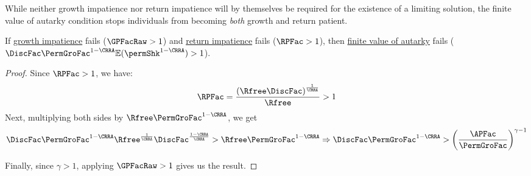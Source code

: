 \documentclass[BufferStockTheory]{subfiles}
\begin{document}
\begin{comment}
below stuff goes in growth section.
Strong growth impatience guarantees that the \textit{expectation} of normalized market resources becomes less than one market resources limit to infinity, since the condition will imply $\min \{\mathbb{E}\frac{\APFac}{\PermGroFacRnd}, \mathbb{E}\frac{R}{\PermGroFacRnd}\}< \GPFacNrm<1$. 


The growth impatience condition relates the \textit{expected} growth factor of permanent income to the \hyperlink{APFAC}{absolute patience factor}. Following the discussion below Assumption \ref{ass:RIC}, the growth factor of the ratio of expected market resources to expected permanent income as $m$ limits to infinity becomes $\min \{\frac{\APFac}{\PermGroFac}, \frac{R}{\PermGroFac}\}$, and we have $\min \{\frac{\APFac}{\PermGroFac}, \frac{R}{\PermGroFac}\}< \GPFacRaw$. Thus, growth impatience ensures the ratio of \textit{expected} market resources to \textit{expected} permanent income eventually falls as $\mNrm$ grows.
\end{comment}

While neither growth impatience nor return impatience will by themselves be required for the existence of a limiting solution, the finite value of autarky condition stops individuals from becoming \textit{both} growth and return patient. 

\begin{claim}\label{claim:noRICGIC}
If \hyperlink{GIC-Raw}{growth impatience} fails ($\GPFacRaw  > 1$) and \hyperlink{RIC}{return impatience} fails ($\RPFac  > 1$), then \hyperlink{FVAC}{finite value of autarky} fails ($\DiscFac \PermGroFac^{1-\CRRA}\mathbb{E}(\permShk^{1-\CRRA})>1$). 
\end{claim}

\begin{proof}
Since $\RPFac  > 1$, we have:
%
%
\begin{equation}
\RPFac = \frac{\left(\Rfree\DiscFac\right)^{\frac{1}{\CRRA}}}{\Rfree}>1
\end{equation}
%
Next, multiplying both sides by $\Rfree\PermGroFac^{1-\CRRA}$, we get
%
\begin{equation}
\DiscFac\PermGroFac^{1-\CRRA}\Rfree^{\frac{1}{\CRRA}}\DiscFac^{\frac{1-\CRRA}{\CRRA}}{}>\Rfree \PermGroFac^{1-\CRRA} \Rightarrow \DiscFac\PermGroFac^{1-\CRRA}>\left(\frac{\APFac}{\PermGroFac}\right)^{\gamma-1}
\end{equation}
%

Finally, since $\gamma>1$, applying $\GPFacRaw  > 1$ gives us the result. 

\end{proof}
\end{document}
